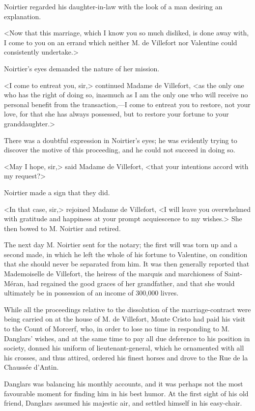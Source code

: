  Noirtier regarded his daughter-in-law with the look of a man desiring an explanation. 

 <Now that this marriage, which I know you so much disliked, is done away with, I come to you on an errand which neither M. de Villefort nor Valentine could consistently undertake.> 

 Noirtier's eyes demanded the nature of her mission. 

 <I come to entreat you, sir,> continued Madame de Villefort, <as the only one who has the right of doing so, inasmuch as I am the only one who will receive no personal benefit from the transaction,—I come to entreat you to restore, not your love, for that she has always possessed, but to restore your fortune to your granddaughter.> 

 There was a doubtful expression in Noirtier's eyes; he was evidently trying to discover the motive of this proceeding, and he could not succeed in doing so. 

 <May I hope, sir,> said Madame de Villefort, <that your intentions accord with my request?> 

 Noirtier made a sign that they did. 

 <In that case, sir,> rejoined Madame de Villefort, <I will leave you overwhelmed with gratitude and happiness at your prompt acquiescence to my wishes.> She then bowed to M. Noirtier and retired. 

 The next day M. Noirtier sent for the notary; the first will was torn up and a second made, in which he left the whole of his fortune to Valentine, on condition that she should never be separated from him. It was then generally reported that Mademoiselle de Villefort, the heiress of the marquis and marchioness of Saint-Méran, had regained the good graces of her grandfather, and that she would ultimately be in possession of an income of 300,000 livres. 

 While all the proceedings relative to the dissolution of the marriage-contract were being carried on at the house of M. de Villefort, Monte Cristo had paid his visit to the Count of Morcerf, who, in order to lose no time in responding to M. Danglars' wishes, and at the same time to pay all due deference to his position in society, donned his uniform of lieutenant-general, which he ornamented with all his crosses, and thus attired, ordered his finest horses and drove to the Rue de la Chaussée d'Antin. 

 Danglars was balancing his monthly accounts, and it was perhaps not the most favourable moment for finding him in his best humor. At the first sight of his old friend, Danglars assumed his majestic air, and settled himself in his easy-chair. 

